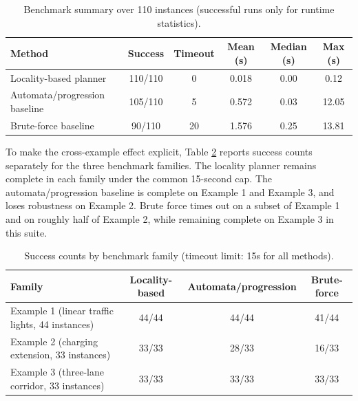 \documentclass[]{jair}
\begin{document}
\begin{table}[ht!]
\centering
\caption{Benchmark summary over 110 instances (successful runs only for runtime statistics).}
\label{t:eval}
\begin{tabular}{lccccc}
\toprule
Method & Success & Timeout & Mean (s) & Median (s) & Max (s) \\
\midrule
Locality-based planner & 110/110 & 0 & 0.018 & 0.00 & 0.12 \\
Automata/progression baseline & 105/110 & 5 & 0.572 & 0.03 & 12.05 \\
Brute-force baseline & 90/110 & 20 & 1.576 & 0.25 & 13.81 \\
\bottomrule
\end{tabular}
\end{table}

To make the cross-example effect explicit, Table \ref{t:eval-families} reports success counts separately for the three benchmark families. The locality planner remains complete in each family under the common 15-second cap. The automata/progression baseline is complete on Example 1 and Example 3, and loses robustness on Example 2. Brute force times out on a subset of Example 1 and on roughly half of Example 2, while remaining complete on Example 3 in this suite.

\begin{table}[ht!]
\centering
\caption{Success counts by benchmark family (timeout limit: 15s for all methods).}
\label{t:eval-families}
\begin{tabular}{lccc}
\toprule
Family & Locality-based & Automata/progression & Brute-force \\
\midrule
Example 1 (linear traffic lights, 44 instances) & 44/44 & 44/44 & 41/44 \\
Example 2 (charging extension, 33 instances) & 33/33 & 28/33 & 16/33 \\
Example 3 (three-lane corridor, 33 instances) & 33/33 & 33/33 & 33/33 \\
\bottomrule
\end{tabular}
\end{table}
\end{document}
